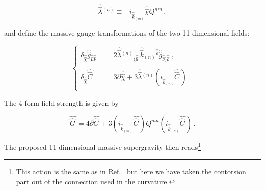 \documentclass[12pt,a4paper]{article}
\begin{document}
\begin{equation}
\hat{\hat{\lambda}}{}^{(n)} 
\equiv
-i_{\hat{\hat{k}}_{\scriptscriptstyle (m)}}\hat{\hat{\chi}} 
Q^{nm} \, ,
\end{equation}

\noindent and define the massive gauge transformations of the two 
11-dimensional fields:

\begin{equation}
\left\{\begin{array}{rcl}
\delta_{\hat{\hat{\chi}}}
\hat{\hat{g}}_{\hat{\hat{\mu}}\hat{\hat{\nu}}} & = &
2\hat{\hat{\lambda}}{}^{(n)}{}_{(\hat{\hat{\mu}}}\,  
\hat{\hat{k}}_{(n)}{}^{\hat{\hat{\rho}}}
\hat{\hat{g}}_{\hat{\hat{\nu}})\hat{\hat{\rho}}} \; ,\\
& & \\
\delta_{\hat{\hat{\chi}}} \hat{\hat{C}\,} & = & 
3\partial\hat{\hat{\chi}} 
+3\hat{\hat{\lambda}}{}^{(n)}
\left(i_{\hat{\hat{k}}_{\scriptscriptstyle (n)}}\hat{\hat{C}\,}\right) \; .\\
\end{array}
\right.
\end{equation}

The 4-form field strength is given by 

\begin{equation}
\hat{\hat{G}\,} = 
4\partial \hat{\hat{C}\,} 
+3\left(i_{\hat{\hat{k}}_{\scriptscriptstyle (m)}}\hat{\hat{C}\,}\right)Q^{mn}
\left(i_{\hat{\hat{k}}_{\scriptscriptstyle (n)}}\hat{\hat{C}\,}\right)\, .
\end{equation}

\noindent The proposed 11-dimensional massive supergravity then 
reads\footnote{This action is the same as in Ref.~\cite{kn:MO} but
  here we have taken the contorsion part out of the connection used in
  the curvature.}
\end{document}
